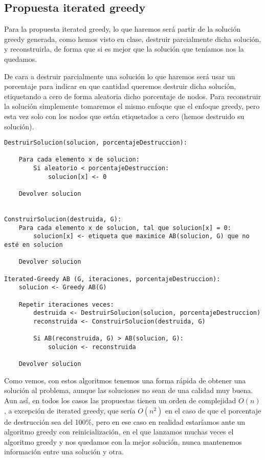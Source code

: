 \subsection{Propuesta iterated greedy}

Para la propuesta iterated greedy, lo que haremos será partir de la solución greedy generada, como hemos visto en clase, destruir parcialmente dicha solución, y reconstruirla, de forma que si es mejor que la solución que teníamos nos la quedamos.

De cara a destruir parcialmente una solución lo que haremos será usar un porcentaje para indicar en que cantidad queremos destruir dicha solución, etiquetando a cero de forma aleatoria dicho porcentaje de nodos. Para reconstruir la solución simplemente tomaremos el mismo enfoque que el enfoque greedy, pero esta vez solo con los nodos que están etiquetados a cero (hemos destruido su solución).

\begin{lstlisting}
DestruirSolucion(solucion, porcentajeDestruccion):

	Para cada elemento x de solucion:
		Si aleatorio < porcentajeDestruccion:
			solucion[x] <- 0

	Devolver solucion


ConstruirSolucion(destruida, G):
	Para cada elemento x de solucion, tal que solucion[x] = 0:
		solucion[x] <- etiqueta que maximice AB(solucion, G) que no esté en solucion

	Devolver solucion

Iterated-Greedy AB (G, iteraciones, porcentajeDestruccion):
	solucion <- Greedy AB(G)

	Repetir iteraciones veces:
		destruida <- DestruirSolucion(solucion, porcentajeDestruccion)
		reconstruida <- ConstruirSolucion(destruida, G)

		Si AB(reconstruida, G) > AB(solucion, G):
			solucion <- reconstruida

	Devolver solucion
\end{lstlisting}

Como vemos, con estos algoritmos tenemos una forma rápida de obtener una solución al problema, aunque las soluciones no sean de una calidad muy buena. Aun así, en todos los casos las propuestas tienen un orden de complejidad $O(n)$, a excepción de iterated greedy, que sería $O(n^2)$ en el caso de que el porcentaje de destrucción sea del 100\%, pero en ese caso en realidad estaríamos ante un algoritmo greedy con reinicialización, en el que lanzamos muchas veces el algoritmo greedy y nos quedamos con la mejor solución, nunca mantenemos información entre una solución y otra.


